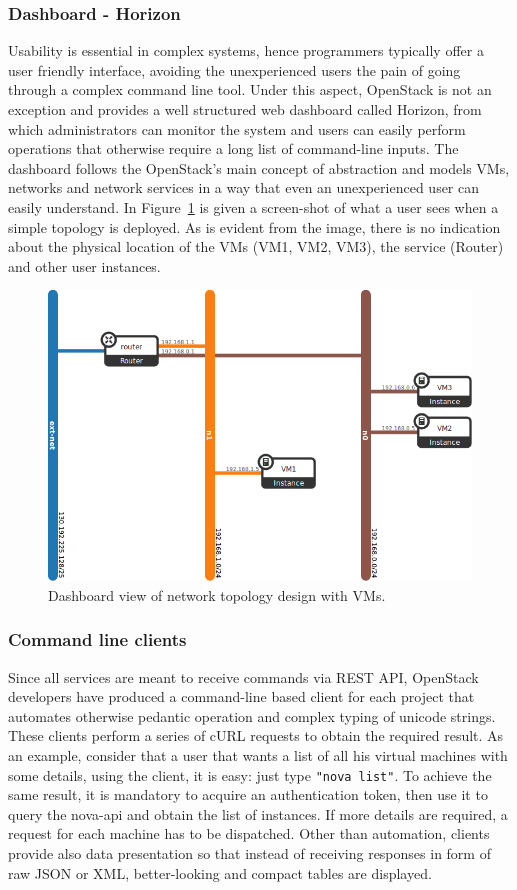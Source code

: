 \subsubsection{Dashboard - Horizon}
Usability is essential in complex systems, hence programmers typically offer a user friendly interface, avoiding the unexperienced users the pain of going through a complex command line tool.
Under this aspect, OpenStack is not an exception and provides a well structured web dashboard called Horizon, from which administrators can monitor the system and users can easily perform operations that otherwise require a long list of command-line inputs.
The dashboard follows the OpenStack's main concept of abstraction and models VMs, networks and network services in a way that even an unexperienced user can easily understand. In Figure~\ref{fig:OSdashboard} is given a screen-shot of what a user sees when a simple topology is deployed. As is evident from the image, there is no indication about the physical location of the VMs (VM1, VM2, VM3), the service (Router) and other user instances.
\begin{figure}[h]
	\centering
	\includegraphics[clip= true, width=0.9 \columnwidth]{images/neutron-topology-example.png}
	\caption{Dashboard view of network topology design with VMs.}
	\label{fig:OSdashboard}
\end{figure}

\subsubsection{Command line clients}
Since all services are meant to receive commands via REST API, OpenStack developers have produced a command-line based client for each project that automates otherwise pedantic operation and complex typing of unicode strings.
These clients perform a series of cURL requests to obtain the required result.
As an example, consider that a user that wants a list of all his virtual machines with some details, using the client, it is easy: just type \texttt{"nova list"}. To achieve the same result, it is mandatory to acquire an authentication token, then use it to query the nova-api and obtain the list of instances. If more details are required, a request for each machine has to be dispatched.
Other than automation, clients provide also data presentation so that instead of receiving responses in form of raw JSON or XML, better-looking and compact tables are displayed.

